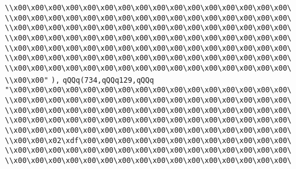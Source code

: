 \verb|\\x00\x00\x00\x00\x00\x00\x00\x00\x00\x00\x00\x00\x00\x00\x00\x00\|\newline
\verb|\\x00\x00\x00\x00\x00\x00\x00\x00\x00\x00\x00\x00\x00\x00\x00\x00\|\newline
\verb|\\x00\x00\x00\x00\x00\x00\x00\x00\x00\x00\x00\x00\x00\x00\x00\x00\|\newline
\verb|\\x00\x00\x00\x00\x00\x00\x00\x00\x00\x00\x00\x00\x00\x00\x00\x00\|\newline
\verb|\\x00\x00\x00\x00\x00\x00\x00\x00\x00\x00\x00\x00\x00\x00\x00\x00\|\newline
\verb|\\x00\x00\x00\x00\x00\x00\x00\x00\x00\x00\x00\x00\x00\x00\x00\x00\|\newline
\verb|\\x00\x00\x00\x00\x00\x00\x00\x00\x00\x00\x00\x00\x00\x00\x00\x00\|\newline
\verb|\\x00\x00"|\newline
\verb|),|\newline
\verb|qQQq(734,qQQq129,qQQq|\newline
\verb|"\x00\x00\x00\x00\x00\x00\x00\x00\x00\x00\x00\x00\x00\x00\x00\x00\|\newline
\verb|\\x00\x00\x00\x00\x00\x00\x00\x00\x00\x00\x00\x00\x00\x00\x00\x00\|\newline
\verb|\\x00\x00\x00\x00\x00\x00\x00\x00\x00\x00\x00\x00\x00\x00\x00\x00\|\newline
\verb|\\x00\x00\x00\x00\x00\x00\x00\x00\x00\x00\x00\x00\x00\x00\x00\x00\|\newline
\verb|\\x00\x00\x00\x00\x00\x00\x00\x00\x00\x00\x00\x00\x00\x00\x00\x00\|\newline
\verb|\\x00\x00\x02\xdf\x00\x00\x00\x00\x00\x00\x00\x00\x00\x00\x00\x00\|\newline
\verb|\\x00\x00\x00\x00\x00\x00\x00\x00\x00\x00\x00\x00\x00\x00\x00\x00\|\newline
\verb|\\x00\x00\x00\x00\x00\x00\x00\x00\x00\x00\x00\x00\x00\x00\x00\x00\|\newline
